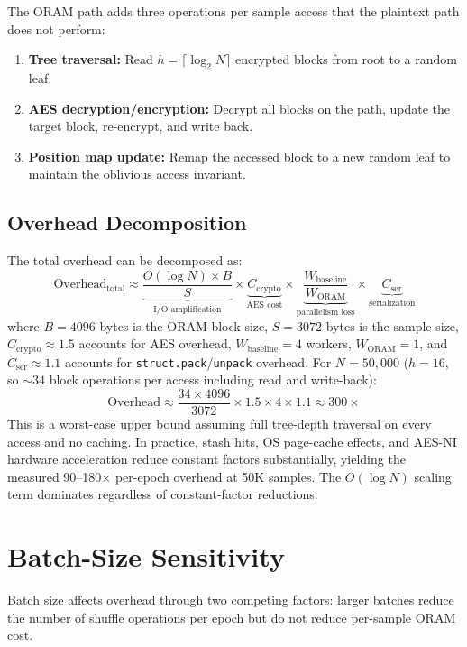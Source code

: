 \documentclass[11pt]{article}
\begin{document}
\medskip
The ORAM path adds three operations per sample access that the plaintext path does not perform:
\begin{enumerate}
    \item \textbf{Tree traversal:} Read $h = \lceil \log_2 N \rceil$ encrypted blocks from root to a random leaf.
    \item \textbf{AES decryption/encryption:} Decrypt all blocks on the path, update the target block, re-encrypt, and write back.
    \item \textbf{Position map update:} Remap the accessed block to a new random leaf to maintain the oblivious access invariant.
\end{enumerate}

\subsection{Overhead Decomposition}

The total overhead can be decomposed as:
\[
\text{Overhead}_{\text{total}} \approx \underbrace{\frac{O(\log N) \times B}{S}}_{\text{I/O amplification}} \times \underbrace{C_{\text{crypto}}}_{\text{AES cost}} \times \underbrace{\frac{W_{\text{baseline}}}{W_{\text{ORAM}}}}_{\text{parallelism loss}} \times \underbrace{C_{\text{ser}}}_{\text{serialization}}
\]
where $B = 4096$ bytes is the ORAM block size, $S = 3072$ bytes is the sample size, $C_{\text{crypto}} \approx 1.5$ accounts for AES overhead, $W_{\text{baseline}} = 4$ workers, $W_{\text{ORAM}} = 1$, and $C_{\text{ser}} \approx 1.1$ accounts for \texttt{struct.pack}/\texttt{unpack} overhead.
For $N = 50{,}000$ ($h = 16$, so ${\sim}34$ block operations per access including read and write-back):
\[
\text{Overhead} \approx \frac{34 \times 4096}{3072} \times 1.5 \times 4 \times 1.1 \approx 300\times
\]
This is a worst-case upper bound assuming full tree-depth traversal on every access and no caching.
In practice, stash hits, OS page-cache effects, and AES-NI hardware acceleration reduce constant factors substantially, yielding the measured 90--180$\times$ per-epoch overhead at 50K samples.
The $O(\log N)$ scaling term dominates regardless of constant-factor reductions.

\section{Batch-Size Sensitivity}

Batch size affects overhead through two competing factors: larger batches reduce the number of shuffle operations per epoch but do not reduce per-sample ORAM cost.
\end{document}
